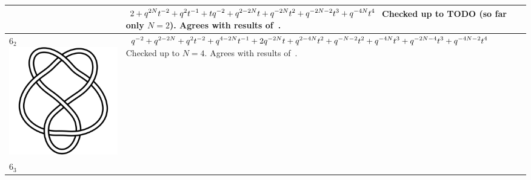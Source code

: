 \documentclass{compositio}
\theoremstyle{definition}
\numberwithin{equation}{section}
\begin{document}
{\begin{longtable}{p{}|p{}}
& 
$
\displaystyle{%
2+q^{2 N}t^{-2}+q^2 t^{-1}+ t q^{-2} + q^{2-2N} t+q^{-2 N} t^2+q^{-2N-2} t^3+q^{-4 N} t^4
}
$
\newline\newline\newline\newline
Checked up to TODO (so far only $N=2$). Agrees with results of~\cite{r0508510, r0607544}. 
\\
\hline
$6_{2}$ 
\includegraphics[scale=0.07,angle=0]{knot6_2.pdf} 
& 
$
\displaystyle{%
q^{-2} + q^{2-2 N} + q^2t^{-2} + q^{4-2 N} t^{-1} + 2 q^{-2 N} t+q^{2-4 N} t^2+q^{-N-2} t^2+q^{-4 N} t^3+q^{-2N-4} t^3+q^{-4N-2} t^4
}
$
\newline\newline\newline\newline
Checked up to $N=4$. Agrees with results of~\cite{r0508510, r0607544}. 
\\
\hline
$6_{3}$ 

\end{longtable}}
\end{document}
